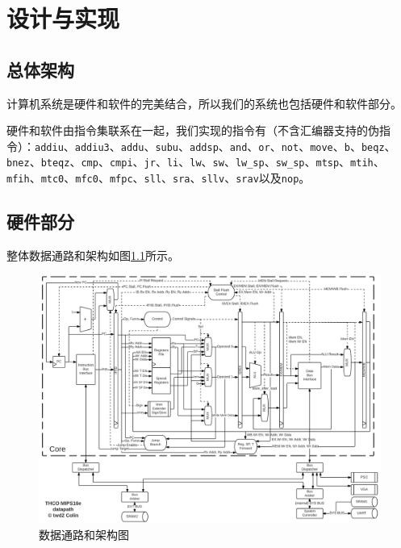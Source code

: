 \documentclass[11pt,utf8]{report}
\begin{document}
\chapter{设计与实现}

\section{总体架构}
	\par 计算机系统是硬件和软件的完美结合，所以我们的系统也包括硬件和软件部分。
	\par 硬件和软件由指令集联系在一起，我们实现的指令有（不含汇编器支持的伪指令）：\texttt{addiu}、\texttt{addiu3}、\texttt{addu}、\texttt{subu}、\texttt{addsp}、\texttt{and}、\texttt{or}、\texttt{not}、\texttt{move}、\texttt{b}、\texttt{beqz}、\texttt{bnez}、\texttt{bteqz}、\texttt{cmp}、\texttt{cmpi}、\texttt{jr}、\texttt{li}、\texttt{lw}、\texttt{sw}、\texttt{lw\_sp}、\texttt{sw\_sp}、\texttt{mtsp}、\texttt{mtih}、\texttt{mfih}、\texttt{mtc0}、\texttt{mfc0}、\texttt{mfpc}、\texttt{sll}、\texttt{sra}、\texttt{sllv}、\texttt{srav}以及\texttt{nop}。

\section{硬件部分}

	整体数据通路和架构如图\ref{datapath}所示。

	\begin{figure}[H]
		\centering
		\setlength{\leftskip}{-40pt}
		\includegraphics[width=1.2\textwidth]{datapath}
		\caption{数据通路和架构图}
		\label{datapath}
	\end{figure}
\end{document}
